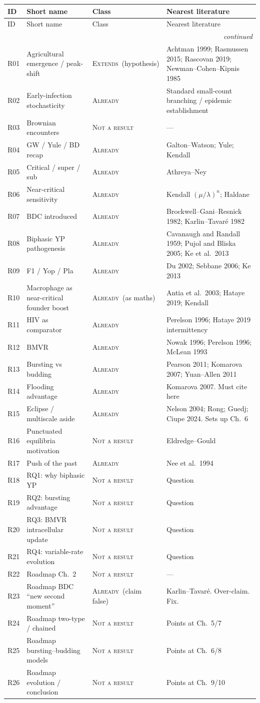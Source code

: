 \documentclass[11pt,a4paper]{report}
\newcommand{\cls}[1]{\textsc{#1}}
\newcommand{\ext}{\cls{Extends}}
\newcommand{\alr}{\cls{Already}}
\newcommand{\nar}{\cls{Not a result}}
\newcommand{\itemhead}{%
  \toprule
  ID & Short name & Class & Nearest literature \\
  \midrule
  \endfirsthead
  \toprule
  ID & Short name & Class & Nearest literature \\
  \midrule
  \endhead
  \midrule
  \multicolumn{4}{r}{\footnotesize\itshape continued} \\
  \endfoot
  \bottomrule
  \endlastfoot
}
\newcommand{\itemtable}{\begin{longtable}{L{1.55cm}L{4.35cm}L{2.35cm}L{6.55cm}}}
\begin{document}
\itemtable
\itemhead
R01 & Agricultural emergence / peak-shift & \ext\ (hypothesis) &
Achtman 1999; Rasmussen 2015; Rascovan 2019; Newman--Cohen--Kipnis 1985 \\
R02 & Early-infection stochasticity & \alr &
Standard small-count branching / epidemic establishment \\
R03 & Brownian encounters & \nar & --- \\
R04 & GW / Yule / BD recap & \alr & Galton--Watson; Yule; Kendall \\
R05 & Critical / super / sub & \alr & Athreya--Ney \\
R06 & Near-critical sensitivity & \alr & Kendall \((\mu/\lambda)^n\); Haldane \\
R07 & BDC introduced & \alr &
Brockwell--Gani--Resnick 1982; Karlin--Tavar\'e 1982 \\
R08 & Biphasic YP pathogenesis & \alr &
Cavanaugh and Randall 1959; Pujol and Bliska 2005; Ke et al.\ 2013 \\
R09 & F1 / Yop / Pla & \alr & Du 2002; Sebbane 2006; Ke 2013 \\
R10 & Macrophage as near-critical founder boost & \alr\ (as maths) &
Antia et al.\ 2003; Hataye 2019; Kendall \\
R11 & HIV as comparator & \alr & Perelson 1996; Hataye 2019 intermittency \\
R12 & BMVR & \alr & Nowak 1996; Perelson 1996; McLean 1993 \\
R13 & Bursting vs budding & \alr &
Pearson 2011; Komarova 2007; Yuan--Allen 2011 \\
R14 & Flooding advantage & \alr & Komarova 2007. Must cite here \\
R15 & Eclipse / multiscale aside & \alr &
Nelson 2004; Rong; Guedj; Ciupe 2024. Sets up Ch.~6 \\
R16 & Punctuated equilibria motivation & \nar & Eldredge--Gould \\
R17 & Push of the past & \alr & Nee et al.\ 1994 \\
R18 & RQ1: why biphasic YP & \nar & Question \\
R19 & RQ2: bursting advantage & \nar & Question \\
R20 & RQ3: BMVR intracellular update & \nar & Question \\
R21 & RQ4: variable-rate evolution & \nar & Question \\
R22 & Roadmap Ch.~2 & \nar & --- \\
R23 & Roadmap BDC ``new second moment'' & \alr\ (claim false) &
Karlin--Tavar\'e. Over-claim. Fix. \\
R24 & Roadmap two-type / chained & \nar & Points at Ch.~5/7 \\
R25 & Roadmap bursting--budding models & \nar & Points at Ch.~6/8 \\
R26 & Roadmap evolution / conclusion & \nar & Points at Ch.~9/10 \\
\end{longtable}
\end{document}
